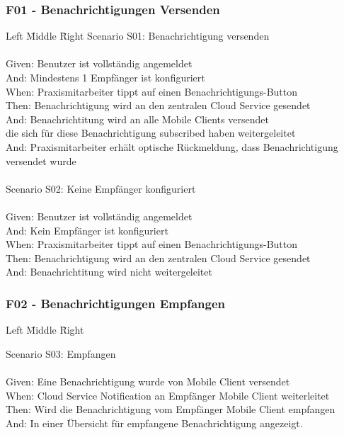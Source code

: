 \subsubsection*{F01 - Benachrichtigungen Versenden}
\begin{tabbing}
    Left \= Middle \= Right \kill
    Scenario S01: \> \> Benachrichtigung versenden\\ \\
    Given:  \> \> Benutzer ist vollständig angemeldet\\
    And:    \> \> Mindestens 1 Empfänger ist konfiguriert\\
    When:  \> \> Praxismitarbeiter tippt auf einen Benachrichtigungs-Button\\
    Then:   \> \> Benachrichtigung wird an den zentralen Cloud Service gesendet\\
    And:    \> \> Benachrichtitung wird an alle Mobile Clients versendet\\
    \> \> die sich für diese Benachrichtigung subscribed haben weitergeleitet\\
    And:    \> \> Praxismitarbeiter erhält optische Rückmeldung, dass Benachrichtigung versendet wurde\\

    \\
    Scenario S02: \> \> Keine Empfänger konfiguriert\\ \\
    Given:  \> \>  Benutzer ist vollständig angemeldet\\
    And:  \> \>    Kein Empfänger ist konfiguriert\\
    When:  \> \>   Praxismitarbeiter tippt auf einen Benachrichtigungs-Button\\
    Then:  \> \>   Benachrichtigung wird an den zentralen Cloud Service gesendet\\
    And:  \> \>    Benachrichtitung wird nicht weitergeleitet\\

\end{tabbing}


\subsubsection*{F02 - Benachrichtigungen Empfangen}
\begin{tabbing}
    Left \= Middle \= Right \kill

    Scenario S03:  \> \> Empfangen\\ \\
    Given:  \> \>  Eine Benachrichtigung wurde von Mobile Client versendet\\
    When:  \> \>   Cloud Service Notification an Empfänger Mobile Client weiterleitet\\
    Then:  \> \>   Wird die Benachrichtigung vom Empfänger Mobile Client empfangen\\
    And:  \> \>    In einer Übersicht für empfangene Benachrichtigung angezeigt.\\

\end{tabbing}

